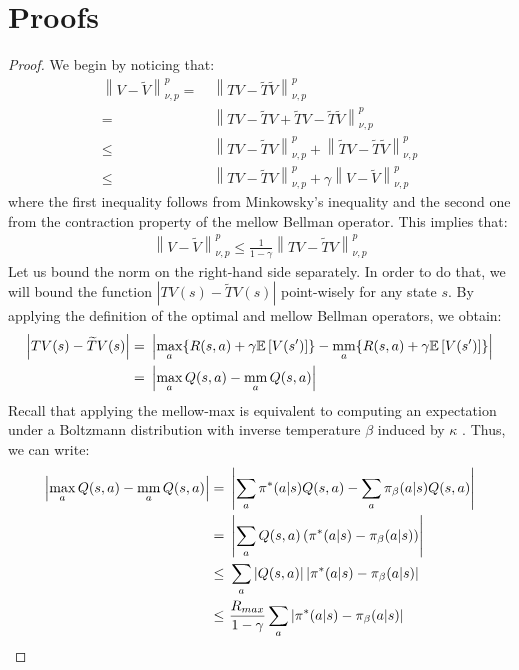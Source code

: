 \documentclass{article}
\newcommand{\mm}{\operatornamewithlimits{mm}}
\newcommand{\wt}[1]{\widetilde{#1}}
\newcommand{\norm}[1]{\left\lVert #1 \right\rVert}
\newcommand{\abs}[1]{\left\lvert #1 \right\rvert}
\begin{document}
\newpage
\appendix

\section{Proofs}

\thmmv*
\begin{proof}
We begin by noticing that:
\begin{align*}
\norm{V-\wt{V}}_{\nu,p}^p =\ & \norm{TV - \wt{T}\wt{V}}_{\nu,p}^p \\ =\ &
\norm{TV - \wt{T}V + \wt{T}V - \wt{T}\wt{V}}_{\nu,p}^p \\ \leq\ &
\norm{TV - \wt{T}V}_{\nu,p}^p + \norm{\wt{T}V - \wt{T}\wt{V}}_{\nu,p}^p \\ \leq\ &
\norm{TV - \wt{T}V}_{\nu,p}^p + \gamma\norm{V - \wt{V}}_{\nu,p}^p
\end{align*}
where the first inequality follows from Minkowsky's inequality and the second one from the contraction property of the mellow Bellman operator. This implies that:
\begin{align} \label{eq:mm1}
\norm{V-\wt{V}}_{\nu,p}^p \leq \frac{1}{1-\gamma}\norm{TV - \wt{T}V}_{\nu,p}^p
\end{align}
Let us bound the norm on the right-hand side separately. In order to do that, we will bound the function $\abs{TV(s) - \wt{T}V(s)}$ point-wisely for any state $s$. By applying the definition of the optimal and mellow Bellman operators, we obtain:
\begin{align*}
\abs{TV(s) - \wt{T}V(s)} =\ & \abs{\max_{a}\lbrace R(s,a) + \gamma\mathbb{E}\left[V(s')\right] \rbrace - \mm_{a}\lbrace R(s,a) + \gamma\mathbb{E}\left[V(s')\right] \rbrace}\\ =\ & \abs{\max_a Q(s,a) - \mm_a Q(s,a)}
\end{align*}
Recall that applying the mellow-max is equivalent to computing an expectation under a Boltzmann distribution with inverse temperature $\beta$ induced by $\kappa$ \cite{}. Thus, we can write:
\begin{align} \label{eq:mm2}
\abs{\max_a Q(s,a) - \mm_a Q(s,a)} =\ & \abs{\sum_a \pi^*(a|s)Q(s,a) - \sum_a \pi_{\beta}(a|s)Q(s,a)}\notag\\ =\ & \abs{\sum_a Q(s,a) \left( \pi^*(a|s) - \pi_{\beta}(a|s)  \right)}\notag\\ \leq\ & \sum_a \abs{Q(s,a)} \abs{\pi^*(a|s) - \pi_{\beta}(a|s)}\notag\\ \leq\ & \frac{R_{max}}{1-\gamma}\sum_a\abs{\pi^*(a|s) - \pi_{\beta}(a|s)}
\end{align}

\end{proof}
\end{document}
